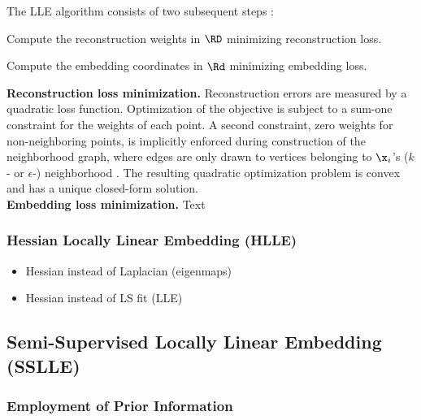 The LLE algorithm consists of two subsequent steps \citep{roweissaul2000}:

\begin{tight_enumerate}
  \item Compute the reconstruction weights in $\RD$ minimizing reconstruction 
  loss.
  \item Compute the embedding coordinates in $\Rd$ minimizing embedding loss.
\end{tight_enumerate}

\textbf{Reconstruction loss minimization.}
Reconstruction errors are measured by a quadratic loss function.
Optimization of the objective is subject to a sum-one constraint for the weights 
of each point.
A second constraint, zero weights for non-neighboring points, is implicitly 
enforced during construction of the neighborhood graph, where edges are only 
drawn to vertices belonging to $\x_i$'s ($k$- or $\epsilon$-) neighborhood 
\citep{ghojoghetal2020}.
The resulting quadratic optimization problem is convex and has a unique 
closed-form solution.
\\

\textbf{Embedding loss minimization.} Text
\\


\subsubsection{Hessian Locally Linear Embedding (HLLE)}
\label{hlle}

\begin{itemize}
  \item Hessian instead of Laplacian (eigenmaps)
  \item Hessian instead of LS fit (LLE)
\end{itemize}


\subsection{Semi-Supervised Locally Linear Embedding (SSLLE)}
\label{sslle}


\subsubsection{Employment of Prior Information}
\label{prior-info}

